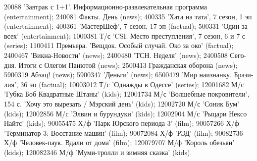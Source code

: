 20088 \foreignlanguage{russian}{'Завтрак с 1+1'. Информационно-развлекательная программа} (entertainment); 240081 \foreignlanguage{russian}{Факты. День} (news); 400335 \foreignlanguage{russian}{'Хата на тата', 7 сезон, 1 эп} (entertainment); 400361 \foreignlanguage{russian}{'МастерШеф', 7 сезон, 17 эп} (factual); 500331 \foreignlanguage{russian}{'Один за всех'} (entertainment); 1000381 \foreignlanguage{russian}{Т/с 'CSI: Место преступления', 7 сезон, 6 и 7 с} (series); 1100411 \foreignlanguage{russian}{Премьера. 'Вещдок. Особый случай. Око за око'} (factual); 2400467 \foreignlanguage{russian}{'Викна-Новости'} (news); 2400480 \foreignlanguage{russian}{'ТСН. Неделя'} (news); 2400508 \foreignlanguage{russian}{Сегодня. Итоги с Олегом Панютой} (news); 2500413 \foreignlanguage{russian}{Гражданская оборона} (news); 5900319 \foreignlanguage{russian}{Абзац!} (news); 5900347 \foreignlanguage{russian}{'Деньги'} (news); 6500479 \foreignlanguage{russian}{'Мир наизнанку. Бразилия', 36 эп} (factual); 10003012 \foreignlanguage{russian}{Т/с 'Однажды в Одессе'} (series); 12001682 \foreignlanguage{russian}{М/с 'Губка Боб Квадратные Штаны'} (kids); 12001734 \foreignlanguage{russian}{М/с 'Волшебные покровители', 154 с. 'Хочу это вырезать / Мэрский день'} (kids); 12002720 \foreignlanguage{russian}{М/с 'Соник Бум'} (kids); 12002856 \foreignlanguage{russian}{М/с 'Элвин и бурундуки'} (kids); 12002904 \foreignlanguage{russian}{М/с 'Рыцари Нексо Найтс'} (kids); 90055475 \foreignlanguage{russian}{Х/ф 'Парк Юрского периода 3'} (film); 90057266 \foreignlanguage{russian}{Х/ф 'Терминатор 3: Восстание машин'} (film); 90072084 \foreignlanguage{russian}{Х/ф 'РЭД'} (film); 90082736 \foreignlanguage{russian}{Х/ф 'Человек-паук. Вдали от дома'} (film); 120079707 \foreignlanguage{russian}{М/ф 'Король обезьян'} (kids); 120082346 \foreignlanguage{russian}{М/ф 'Муми-тролли и зимняя сказка'} (kids).
